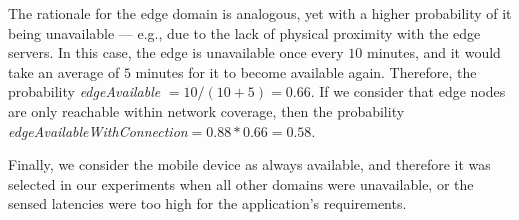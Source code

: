 
The rationale for the edge domain is analogous, yet with a higher probability of it being unavailable --- e.g., due to the lack of physical proximity with the edge servers. In this case, the edge is unavailable once every $10$ minutes, and it would take an average of $5$ minutes for it to become available again. Therefore, the probability \textit{edgeAvailable} $=10/(10+5)=0.66$. If we consider that edge nodes are only reachable within network coverage, then the probability \textit{edgeAvailableWithConnection}$=0.88*0.66=0.58$.

Finally, we consider the mobile device as always available, and therefore it was selected in our experiments when all other domains were unavailable, or the sensed latencies were too high for the application's requirements.




